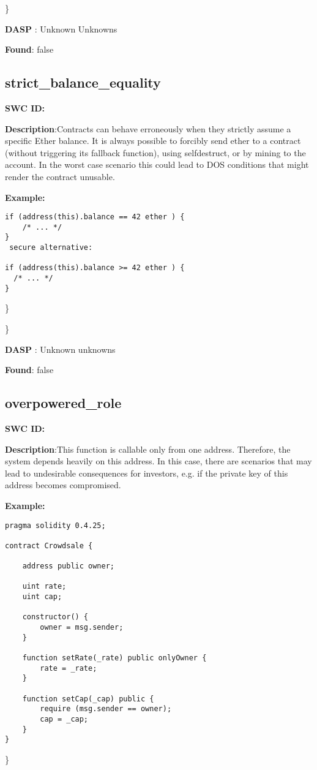 \documentclass{article}
\begin{document}
\} 

\textbf{DASP} : Unknown Unknowns

\textbf{Found}: false

\subsection{strict\_balance\_equality} 
\textbf{SWC \textunderscore ID:} 

\textbf{Description}:Contracts can behave erroneously when they strictly assume a specific Ether balance. It is always possible to forcibly send ether to a contract (without triggering its fallback function), using selfdestruct, or by mining to the account. In the worst case scenario this could lead to DOS conditions that might render the contract unusable.


\textbf{Example:} 
\begin{verbatim}
if (address(this).balance == 42 ether ) {
    /* ... */
}
 secure alternative:

if (address(this).balance >= 42 ether ) {
  /* ... */
}

\end{verbatim}\} 

\} 

\textbf{DASP} : Unknown unknowns

\textbf{Found}: false

\subsection{overpowered\_role} 
\textbf{SWC \textunderscore ID:} 

\textbf{Description}:This function is callable only from one address. Therefore, the system depends heavily on this address. In this case, there are scenarios that may lead to undesirable consequences for investors, e.g. if the private key of this address becomes compromised.


\textbf{Example:} 
\begin{verbatim}
pragma solidity 0.4.25;

contract Crowdsale {

    address public owner;

    uint rate;
    uint cap;

    constructor() {
        owner = msg.sender;
    }

    function setRate(_rate) public onlyOwner {
        rate = _rate;
    }

    function setCap(_cap) public {
        require (msg.sender == owner);
        cap = _cap;
    }
}

\end{verbatim}\} 
\end{document}
